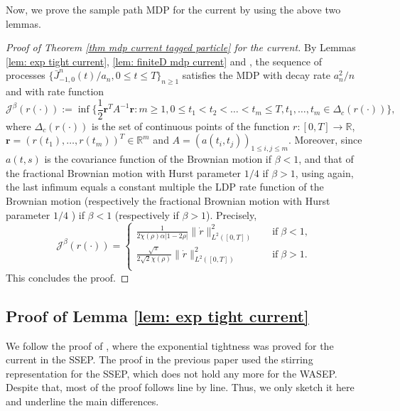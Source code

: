 \documentclass[reqno,11pt]{amsart}
\numberwithin{equation}{section}
\newcommand{\R}{\mathbb{R}}
\begin{document}
Now, we prove the sample path MDP for the current by using the above two lemmas.

\begin{proof}[Proof of Theorem \ref{thm mdp current tagged particle} for the current]
By Lemmas \ref{lem: exp tight current}, \ref{lem: finiteD mdp current} and \cite[Theorem 4.28]{Feng2006LDP}, the sequence of processes $\{\bar{J}^n_{-1,0} (t)/a_n, 0 \leq t \leq T\}_{n \geq 1}$ satisfies the MDP with decay rate $a_n^2/n$ and with rate function
\[\mathcal{J}^\beta (r(\cdot)):=\inf \Big\{\frac{1}{2} \mathbf{r}^T A^{-1} \mathbf{r}:  m \geq 1, 0 \leq t_1 < t_2 < \ldots < t_m \leq T, t_1,\ldots,t_m \in \Delta_c (r(\cdot))\Big\},\]
where $\Delta_c (r(\cdot))$ is the set of continuous points of the function $r: [0,T] \rightarrow \R$, $\mathbf{r} = (r(t_1),\ldots,r(t_m))^T \in \R^m$ and $A=  (a(t_i,t_j))_{1 \leq i,j \leq m}$. Moreover, since $a(t,s)$ is the covariance function of the Brownian motion if $\beta < 1$, and that of the fractional Brownian motion with Hurst parameter $1/4$ if $\beta > 1$, using \cite[Theorem 4.28]{Feng2006LDP} again, the last infimum equals a constant multiple the LDP rate function of the Brownian motion (respectively the fractional Brownian motion with Hurst parameter $1/4$ ) if $\beta < 1$ (respectively if $\beta > 1$). Precisely,
\[\mathcal{J}^\beta (r(\cdot)) = \begin{cases}
\frac{1}{2 \chi(\rho) \alpha |1-2\rho|}  \|\dot{r}\|_{L^2 ([0,T])}^2 \quad &\text{if}\; \beta < 1,\\
\frac{\sqrt{\pi}}{2  \sqrt{2} \chi(\rho)}  \|\dot{r}\|_{L^2 ([0,T])}^2 \quad &\text{if}\; \beta > 1.\\
\end{cases}\]
This concludes the proof.
\end{proof}



\subsection{Proof of Lemma \ref{lem: exp tight current}}\label{subsec: pf lemma 4.1} We follow the proof of  \cite[Lemma 5.2]{xue2024sample},  where the exponential tightness was proved for the current in the SSEP. The proof in the previous paper used the stirring representation for the SSEP, which does not hold any more for the WASEP.  Despite that, most of the proof follows \cite[Lemma 5.2]{xue2024sample} line by line. Thus, we only sketch it here and underline the main differences.
\end{document}
